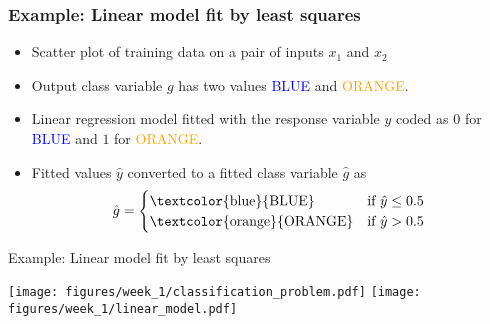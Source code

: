 \documentclass[notes]{beamer}          %
\newcommand{\vect}[1]{\bm{#1}}
\newcommand{\field}[1]{\mathbb{#1}}
\newcommand{\R}{\field{R}}
\newif\iffull
\begin{document}
\begin{frame}
\frametitle{Example: Linear model fit by least squares}
\begin{itemize}
    \item Scatter plot of training data on a pair of inputs $x_1$ and $x_2$
    \item Output class variable $g$ has two values \textcolor{blue}{BLUE} and \textcolor{orange}{ORANGE}.
    \item Linear regression model fitted with the response variable $y$ coded as $0$ for \textcolor{blue}{BLUE} and $1$ for \textcolor{orange}{ORANGE}.
    \item Fitted values $\hat{y}$ converted to a fitted class variable $\hat{g}$ as
    \[ \hat{g} = \begin{cases}
                    \text{\textcolor{blue}{BLUE}}  & \text{if $\hat{y} \leq 0.5$} \\
                    \text{\textcolor{orange}{ORANGE}} & \text{if $\hat{y} > 0.5$ }
                 \end{cases} \]

\end{itemize}
\end{frame}

\begin{frame}{Example: Linear model fit by least squares}
    \begin{center}
        \texttt{[image: figures/week\_1/classification\_problem.pdf]}
        \hfill
        \texttt{[image: figures/week\_1/linear\_model.pdf]}
        \end{center}
\end{frame}

\iffull
\begin{frame}
\frametitle{Example: Linear model fit by least squares}
\begin{itemize}
    \item Two classes separated in the plane ($\R^2$) by the decision boundary $\{ \vect{x} : \vect{w}^T\vect{x} = 0.5 \}$
    \item $\{ \vect{x} : \vect{w}^T\vect{x} < 0.5 \}$ set of \textcolor{blue}{BLUE} points
    \item $\{ \vect{x} : \vect{w}^T\vect{x} \geq 0.5 \}$ set of \textcolor{orange}{ORANGE} points

\end{itemize}
\end{frame}
\fi
\end{document}
